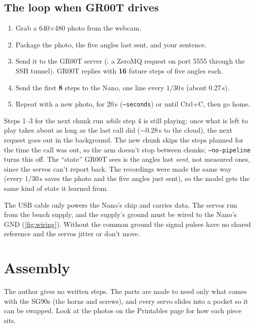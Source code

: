 \documentclass[11pt]{article}
\newcommand{\file}[1]{\texttt{\detokenize{#1}}}
\begin{document}
\subsection{The loop when GR00T drives}
\begin{enumerate}
\item Grab a 640$\times$480 photo from the webcam.
\item Package the photo, the five angles last sent, and your sentence.
\item Send it to the GR00T server (\file{policy_client.py}: a ZeroMQ request on port 5555
  through the SSH tunnel). GR00T replies with \textbf{16} future steps of five angles each.
\item Send the first \textbf{8} steps to the Nano, one line every $1/30$\,s (about 0.27\,s).
\item Repeat with a new photo, for 20\,s (\texttt{--seconds}) or until Ctrl+C, then go home.
\end{enumerate}
Steps 1--3 for the next chunk run \emph{while} step 4 is still playing: once what is left to
play takes about as long as the last call did ($\sim$0.28\,s to the cloud), the next request
goes out in the background. The new chunk skips the steps planned for the time the call was
out, so the arm doesn't stop between chunks; \texttt{--no-pipeline} turns this off.
The ``state'' GR00T sees is the angles last \emph{sent}, not measured ones, since the servos
can't report back. The recordings were made the same way (every $1/30$\,s \file{recorder.py}
saves the photo and the five angles just sent), so the model gets the same kind of state it
learned from.

\begin{note}
The USB cable only powers the Nano's chip and carries data. The servos run from the bench
supply, and the supply's ground must be wired to the Nano's GND (\cref{fig:wiring}). Without
the common ground the signal pulses have no shared reference and the servos jitter or don't move.
\end{note}

\section{Assembly}

The author gives no written steps. The parts are made to need only what comes with the SG90s
(the horns and screws), and every servo slides into a pocket so it can be swapped. Look at
the photos on the Printables page \cite{easyarm} for how each piece sits.
\end{document}
